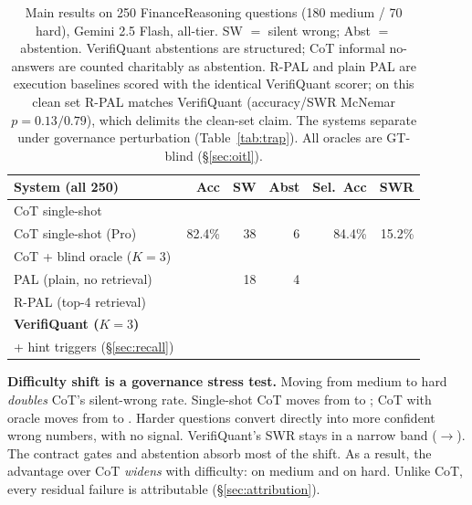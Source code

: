 \begin{table}[t]
\caption{Main results on 250 FinanceReasoning questions (180 medium / 70 hard), Gemini 2.5 Flash, all-tier.
SW $=$ silent wrong; Abst $=$ abstention.
VerifiQuant abstentions are structured; CoT informal no-answers are counted charitably as abstention.
R-PAL and plain PAL are execution baselines scored with the identical VerifiQuant scorer; on this clean set R-PAL matches VerifiQuant (accuracy/SWR McNemar $p{=}0.13/0.79$), which delimits the clean-set claim. The systems separate under governance perturbation (Table~\ref{tab:trap}).
All oracles are GT-blind (\S\ref{sec:oitl}).}
\label{tab:main}
\normalsize
\begin{tabular}{@{}lrrrrr@{}}
\toprule
System (all 250) & Acc & SW & Abst & Sel.\ Acc & SWR \\
\midrule
CoT single-shot & \cotAccAll{} & \cotSWAll{} & \cotAbstainAll{} & \cotSelAccAll{} & \cotSWRAll{} \\
CoT single-shot (Pro) & 82.4\% & 38 & 6 & 84.4\% & 15.2\% \\
CoT + blind oracle ($K{=}3$) & \cotoAccAll{} & \cotoSWAll{} & \cotoAbstainAll{} & \cotoSelAccAll{} & \cotoSWRAll{} \\
\midrule
PAL (plain, no retrieval) & \palAccAll{} & 18 & 4 & \palSelAccAll{} & \palSWRAll{} \\
R-PAL (top-4 retrieval) & \rpalAccAll{} & \rpalSWAll{} & \rpalAbstainAll{} & \rpalSelAccAll{} & \rpalSWRAll{} \\
\midrule
\textbf{VerifiQuant ($K{=}3$)} & \textbf{\vqAccAll{}} & \vqSWAll{} & \vqAbstainAll{} & \vqSelAccAll{} & \textbf{\vqSWRAll{}} \\
\quad + hint triggers (\S\ref{sec:recall}) & \vqtAccAll{} & \vqtSWAll{} & \vqtAbstainAll{} & \vqtSelAccAll{} & \textbf{\vqtSWRAll{}} \\
\bottomrule
\end{tabular}
\end{table}

\textbf{Difficulty shift is a governance stress test.}
Moving from medium to hard \emph{doubles} CoT's silent-wrong rate.
Single-shot CoT moves from \cotSWRMed{} to \cotSWRHard{}; CoT with oracle moves from \cotoSWRMed{} to \cotoSWRHard{}.
Harder questions convert directly into more confident wrong numbers, with no signal.
VerifiQuant's SWR stays in a narrow band (\vqSWRMed{}$\rightarrow$\vqSWRHard{}).
The contract gates and abstention absorb most of the shift.
As a result, the advantage over CoT \emph{widens} with difficulty: \vqSWRatioMed{} on medium and \vqSWRatioHard{} on hard.
Unlike CoT, every residual failure is attributable (\S\ref{sec:attribution}).

